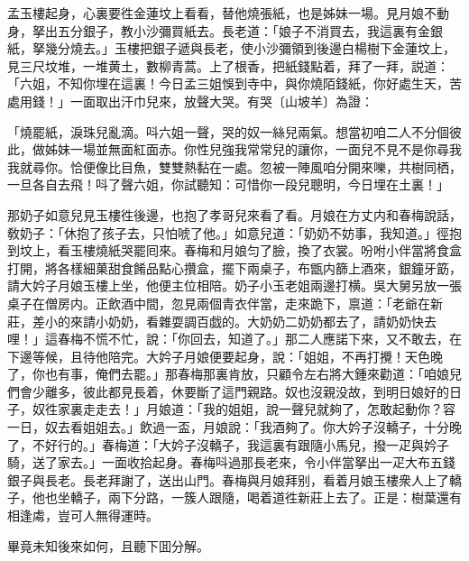 孟玉樓起身，心裏要徃金蓮坟上看看，替他燒張紙，也是姊妹一場。見月娘不動身，拏出五分銀子，教小沙彌買紙去。長老道：「娘子不消買去，我這裏有金銀紙，拏幾分燒去。」玉樓把銀子遞與長老，使小沙彌領到後邊白楊樹下金蓮坟上，見三尺坟堆，一堆黄土，數柳青蒿。上了根香，把紙錢點着，拜了一拜，説道：「六姐，不知你埋在這裏！今日孟三姐悞到寺中，與你燒陌錢紙，你好處生天，苦處用錢！」一面取出汗巾兒來，放聲大哭。有哭〔山坡羊〕為證：

\begin{myquote}
「燒罷紙，淚珠兒亂滴。呌六姐一聲，哭的奴一絲兒兩氣。想當初咱二人不分個彼此，做姊妹一場並無面紅面赤。你性兒強我常常兒的讓你，一面兒不見不是你尋我我就尋你。恰便像比目魚，雙雙熱黏在一處。忽被一陣風咱分開來嚛，共樹同栖，一旦各自去飛！呌了聲六姐，你試聽知：可惜你一段兒聰明，今日埋在土裏！」
\end{myquote}

那奶子如意兒見玉樓徃後邊，也抱了孝哥兒來看了看。月娘在方丈内和春梅說話，敎奶子：「休抱了孩子去，只怕唬了他。」如意兒道：「奶奶不妨事，我知道。」徑抱到坟上，看玉樓燒紙哭罷囘來。春梅和月娘匀了臉，換了衣裳。吩咐小伴當將食盒打開，將各樣細菓甜食餚品點心攢盒，擺下兩桌子，布甑内篩上酒來，銀鐘牙筯，請大妗子月娘玉樓上坐，他便主位相陪。奶子小玉老姐兩邊打横。吳大舅另放一張桌子在僧房内。正飲酒中間，忽見兩個青衣伴當，走來跪下，禀道：「老爺在新莊，差小的來請小奶奶，看雜耍調百戯的。大奶奶二奶奶都去了，請奶奶快去哩！」這春梅不慌不忙，說：「你回去，知道了。」那二人應諾下來，又不敢去，在下邊等候，且待他陪完。大妗子月娘便要起身，說：「姐姐，不再打攪！天色晚了，你也有事，俺們去罷。」那春梅那裏肯放，只顧令左右將大鍾來勸道：「咱娘兒們會少離多，彼此都見長着，休要斷了這門親路。奴也沒親没故，到明日娘好的日子，奴徃家裏走走去！」月娘道：「我的姐姐，說一聲兒就夠了，怎敢起動你？容一日，奴去看姐姐去。」飲過一盃，月娘說：「我酒夠了。你大妗子沒轎子，十分晚了，不好行的。」春梅道：「大妗子沒轎子，我這裏有跟隨小馬兒，撥一疋與妗子騎，送了家去。」一面收拾起身。春梅呌過那長老來，令小伴當拏出一疋大布五錢銀子與長老。長老拜謝了，送出山門。春梅與月娘拜别，看着月娘玉樓衆人上了轎子，他也坐轎子，兩下分路，一簇人跟隨，喝着道徃新莊上去了。正是：樹葉還有相逢䖏，豈可人無得運時。

畢竟未知後來如何，且聽下囬分解。

